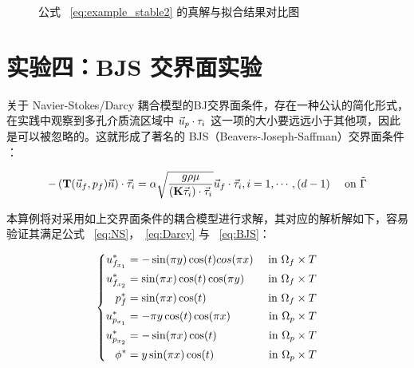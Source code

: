 \begin{figure}[H]
{    }
    \caption{ 公式 ~\eqref{eq:example_stable2} 的真解与拟合结果对比图}
    \label{fig:example_stable2}
\end{figure}

\section{实验四：BJS 交界面实验}

关于 Navier-Stokes/Darcy 耦合模型的BJ交界面条件，存在一种公认的简化形式， 在实践中观察到多孔介质流区域中 $\vec{u}_p \cdot \tau_i$ 这一项的大小要远远小于其他项，因此是可以被忽略的。这就形成了著名的 BJS（Beavers-Joseph-Saffman）交界面条件 \cite{saffman1971boundary}：

\begin{equation}\label{eq:BJS}
    \begin{aligned}
        -\left(\mathbf{T}(\vec{u}_f,p_f) \vec{n} \right) \cdot \vec{\tau}_i = \alpha \sqrt{\frac{g \rho \mu}{(\mathbf{K} \vec{\tau}_i) \cdot \vec{\tau}_i}} \vec{u}_f \cdot \vec{\tau}_i, i=1,\cdots,(d-1) \quad \text{ on } \tilde{\Gamma}
    \end{aligned}
\end{equation}

本算例将对采用如上交界面条件的耦合模型进行求解，其对应的解析解如下，容易验证其满足公式 ~\eqref{eq:NS}，~\eqref{eq:Darcy} 与 ~\eqref{eq:BJS}：

\begin{equation}\label{eq:example_BJS}
    \left\{
    \begin{aligned}
        \Ufi[1]^* &= -\sin(\pi \* y) \* \cos(t) \* cos(\pi \* x) &\textrm{ in } \Df\\
        \Ufi[2]^* &= \sin(\pi \* x) \* \cos(t) \* \cos(\pi \* y) &\textrm{ in } \Df\\
        \pf^* &= \sin(\pi \* x) \* \cos(t) &\textrm{ in } \Df\\
        \Upi[1]^* &= -\pi \* y \* \cos(t) \* \cos(\pi \* x) &\textrm{ in } \Dp\\
        \Upi[2]^* &= - \sin(\pi \* x) \* \cos(t) &\textrm{ in } \Dp\\
        \pp^* &= y \* \sin(\pi \* x) \* \cos(t) &\textrm{ in } \Dp
    \end{aligned}
    \right.
\end{equation}

